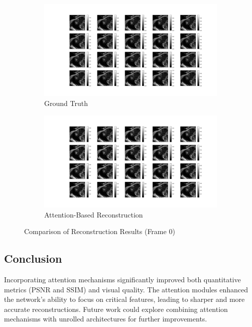 \documentclass{article}
\begin{document}
\begin{figure}[H]
  \centering
  \begin{subfigure}[b]{0.32\linewidth}
    \includegraphics[width=\linewidth]{../images/with_attention/full_sampling/full_sampling_0.png}
    \caption{Ground Truth}
  \end{subfigure}
  \begin{subfigure}[b]{0.32\linewidth}
    \includegraphics[width=\linewidth]{../images/with_attention/reconstruction/reconstruction_0.png}
    \caption{Attention-Based Reconstruction}
  \end{subfigure}
  \caption{Comparison of Reconstruction Results (Frame 0)}
  \label{fig:attention_comparison}
\end{figure}

\subsection{Conclusion}
Incorporating attention mechanisms significantly improved both quantitative metrics (PSNR and SSIM) and visual quality. The attention modules enhanced the network's ability to focus on critical features, leading to sharper and more accurate reconstructions. Future work could explore combining attention mechanisms with unrolled architectures for further improvements.
\end{document}
